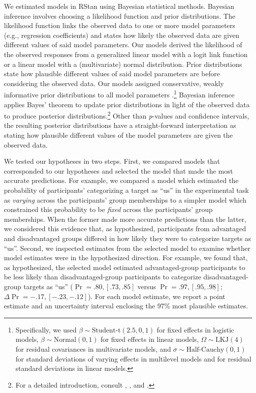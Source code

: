 \documentclass[12pt, a4paper]{article}
\begin{document}
We estimated models in RStan \parencite{stan_development_team_rstan:_2020} using Bayes\-ian statistical methods. Bayesian inference involves choosing a likelihood function and prior distributions. The likelihood function links the observed data to one or more model parameters (e.g., regression coefficients) and states how likely the observed data are given different values of said model parameters. Our models derived the likelihood of the observed responses from a generalized linear model with a logit link function or a linear model with a (multivariate) normal distribution. Prior distributions state how plausible different values of said model parameters are before considering the observed data. Our models assigned conservative, weakly informative prior distributions to all model parameters \parencite{gelman_prior_2017}.\footnote{Specifically, we used $\beta \sim \text{Student-t}(2.5, 0, 1)$ for fixed effects in logistic models, $\beta \sim \text{Normal}(0, 1)$ for fixed effects in linear models, $\Omega \sim \text{LKJ}(4)$ for residual covariances in multivariate models, and $\sigma \sim \text{Half-Cauchy}(0, 1)$ for standard deviations of varying effects in multilevel models and for residual standard deviations in linear models.} Bayesian inference applies Bayes’ theorem to update prior distributions in light of the observed data to produce posterior distributions.\footnote{For a detailed introduction, consult \textcite{gelman_bayesian_2014}, \textcite{lambert_students_2018}, and \textcite{mcelreath_statistical_2016}.} Other than \textit{p}-values and confidence intervals, the resulting posterior distributions have a straight-forward interpretation as stating how plausible different values of the model parameters are given the observed data.

We tested our hypotheses in two steps. First, we compared models that corresponded to our hypotheses and selected the model that made the most accurate predictions. For example, we compared a model which estimated the probability of participants’ categorizing a target as “us” in the experimental task as \emph{varying} across the participants’ group memberships to a simpler model which constrained this probability to be \emph{fixed} across the participants’ group memberships. When the former made more accurate predictions than the latter, we considered this evidence that, as hypothesized, participants from advantaged and disadvantaged groups differed in how likely they were to categorize targets as “us”. Second, we inspected estimates from the selected model to examine whether model estimates were in the hypothesized direction. For example, we found that, as hypothesized, the selected model estimated advantaged-group participants to be less likely than disadvantaged-group participants to categorize disadvantaged-group targets as “us” ($\Pr = .80, [.73, .85]$ versus $\Pr =  .97, [.95, .98]$; $\Delta\Pr =  -.17, [-.23, -.12]$). For each model estimate, we report a point estimate and an uncertainty interval enclosing the 97\% most plausible estimates.
\end{document}
